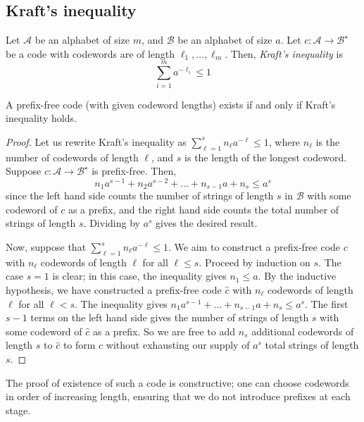 \subsection{Kraft's inequality}
\begin{definition}
    Let \( \mathcal A \) be an alphabet of size \( m \), and \( \mathcal B \) be an alphabet of size \( a \).
    Let \( c \colon \mathcal A \to \mathcal B^\star \) be a code with codewords are of length \( \ell_1, \dots, \ell_m \).
    Then, \emph{Kraft's inequality} is
    \[ \sum_{i=1}^m a^{-\ell_i} \leq 1 \]
\end{definition}
\begin{theorem}
    A prefix-free code (with given codeword lengths) exists if and only if Kraft's inequality holds.
\end{theorem}
\begin{proof}
    Let us rewrite Kraft's inequality as \( \sum_{\ell=1}^s n_\ell a^{-\ell} \leq 1 \), where \( n_\ell \) is the number of codewords of length \( \ell \), and \( s \) is the length of the longest codeword.
    Suppose \( c \colon \mathcal A \to \mathcal B^\star \) is prefix-free.
    Then,
    \[ n_1 a^{s-1} + n_2 a^{s-2} + \dots + n_{s-1} a + n_s \leq a^s \]
    since the left hand side counts the number of strings of length \( s \) in \( \mathcal B \) with some codeword of \( c \) as a prefix, and the right hand side counts the total number of strings of length \( s \).
    Dividing by \( a^s \) gives the desired result.

    Now, suppose that \( \sum_{\ell=1}^s n_\ell a^{-\ell} \leq 1 \).
    We aim to construct a prefix-free code \( c \) with \( n_\ell \) codewords of length \( \ell \) for all \( \ell \leq s \).
    Proceed by induction on \( s \).
    The case \( s = 1 \) is clear; in this case, the inequality gives \( n_1 \leq a \).
    By the inductive hypothesis, we have constructed a prefix-free code \( \hat c \) with \( n_\ell \) codewords of length \( \ell \) for all \( \ell < s \).
    The inequality gives \( n_1 a^{s-1} + \dots + n_{s-1} a + n_s \leq a^s \).
    The first \( s - 1 \) terms on the left hand side gives the number of strings of length \( s \) with some codeword of \( \hat c \) as a prefix.
    So we are free to add \( n_s \) additional codewords of length \( s \) to \( \hat c \) to form \( c \) without exhausting our supply of \( a^s \) total strings of length \( s \).
\end{proof}
\begin{remark}
    The proof of existence of such a code is constructive; one can choose codewords in order of increasing length, ensuring that we do not introduce prefixes at each stage.
\end{remark}

